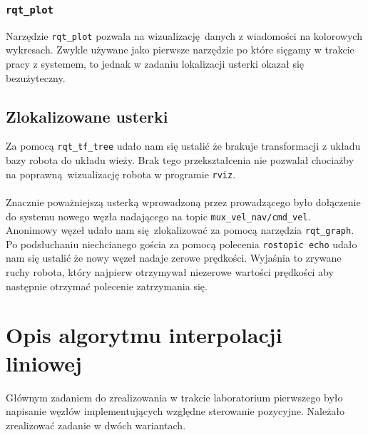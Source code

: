 \documentclass{mwrep}
\begin{document}
\subsubsection{\texttt{rqt\_{}plot}}
Narzędzie \texttt{rqt\_{}plot} pozwala na wizualizację danych z wiadomości
na kolorowych wykresach. Zwykle używane jako pierwsze narzędzie po które sięgamy 
w trakcie pracy z systemem, to jednak w zadaniu lokalizacji usterki okazał się 
bezużyteczny. 

\subsection{Zlokalizowane usterki}
\label{lab1_errors_faults}
Za pomocą \texttt{rqt\_{}tf\_{}tree} udało nam się ustalić że brakuje transformacji z
układu bazy robota do układu wieży. Brak tego przekształcenia nie pozwalał chociażby
na poprawną wizualizację robota w programie \texttt{rviz}. \\
\\
Znacznie poważniejszą usterką wprowadzoną przez prowadzącego było dołączenie do systemu
nowego węzła nadającego na topic \texttt{mux\_{}vel\_{}nav/cmd\_{}vel}. Anonimowy węzeł 
udało nam się zlokalizować za pomocą narzędzia \texttt{rqt\_{}graph}. Po podsłuchaniu 
niechcianego gościa za pomocą polecenia \texttt{rostopic echo} udało nam się ustalić 
że nowy węzeł nadaje zerowe prędkości. Wyjaśnia to zrywane ruchy robota, który najpierw
otrzymywał niezerowe wartości prędkości aby następnie otrzymać polecenie zatrzymania się.

\section{Opis algorytmu interpolacji liniowej}
\label{lab1_interpolation}
Głównym zadaniem do zrealizowania w trakcie laboratorium pierwszego było napisanie węzłów
implementujących względne sterowanie pozycyjne. Należało zrealizować zadanie w dwóch
wariantach. 
\end{document}
